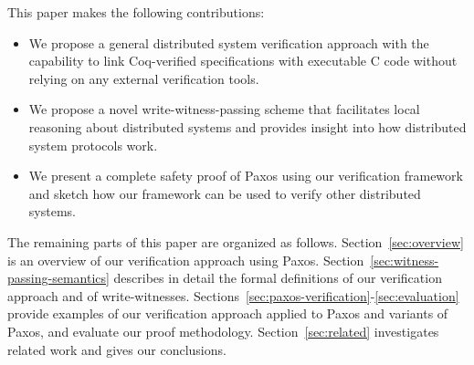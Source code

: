 This paper makes the following contributions:
\begin{itemize}
	\item We propose a general distributed system verification approach with the capability to link Coq-verified specifications with executable C code without relying on any external verification tools.
	\item We propose a novel write-witness-passing scheme that facilitates local reasoning about distributed systems and provides insight into how distributed system protocols work.
	\item We present a complete safety proof of Paxos using our verification framework and sketch how our framework can be used to verify other distributed systems.
\end{itemize}


The remaining parts of this paper are organized as follows.
Section~\ref{sec:overview} is an overview of our verification approach using Paxos.
Section~\ref{sec:witness-passing-semantics} describes in detail the formal definitions of our verification approach and of write-witnesses.
Sections~\ref{sec:paxos-verification}-\ref{sec:evaluation} provide examples of
our verification approach applied to Paxos and variants of Paxos, and evaluate
our proof methodology. 
Section~\ref{sec:related} investigates related work and gives our conclusions.




